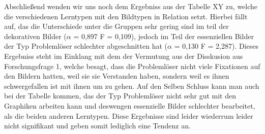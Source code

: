 Abschließend wenden wir uns noch dem Ergebniss aus der Tabelle XY zu, welche die verschiedenen Lerntypen mit den Bildtypen in Relation setzt. Hierbei fällt auf, das die Unterschiede unter die Gruppen sehr gering sind im teil der dekorativen Bilder ($\alpha$ = 0,897 F = 0,109), jedoch im Teil der essenziellen Bilder der Typ Problemlöser schlechter abgeschnitten hat ($\alpha$ = 0,130 F = 2,287). Dieses Ergebniss steht im Einklang mit dem der Vermutung aus der Disskusion aus Forschungsfrage 1, welche besagt, dass die Problemlöser nicht viele Fixationen auf den Bildern hatten, weil sie sie Verstanden haben, sondern weil es ihnen schwergefallen ist mit ihnen um zu gehen. Auf den Selben Schluss kann man auch bei der Tabelle kommen, das der Typ Problemlöser nicht sehr gut mit den Graphiken arbeiten kann und deswengen essenzielle Bilder schlechter bearbeitet, als die beiden anderen Lerntypen. Diese Ergebnisse sind leider wiederrum leider nicht signifikant und geben somit lediglich eine Tendenz an. 
